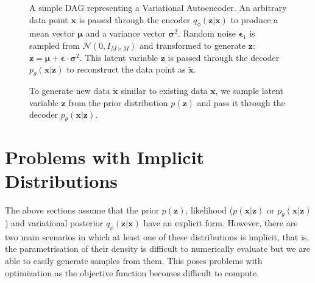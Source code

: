 \documentclass[honours,12pt]{unswthesis}
\numberwithin{equation}{section}
\theoremstyle{definition}
\begin{document}
\begin{figure}[h]
  \centering
   \caption{\small A simple DAG representing a Variational Autoencoder. An arbitrary data point $\bm{x}$ is passed through the encoder $q_\phi(\bm{z}|\bm{x})$ to produce a mean vector $\bm{\mu}$ and a variance vector $\bm{\sigma}^2$. Random noise $\bm{\epsilon}_1$ is sampled from $\mathcal{N}(0,I_{M\times M})$ and transformed to generate $\bm{z}$: $\bm{z}=\bm{\mu}+\bm{\epsilon}\cdot \bm{\sigma}^2$. This latent variable $\bm{z}$ is passed through the decoder $p_\theta(\bm{x}|\bm{z})$ to reconstruct the data point as $\tilde{\bm{x}}$.}
   \label{fig:3.3}
\end{figure}
\begin{figure}[h]
  \centering
   \caption{\small To generate new data $\tilde{\bm{x}}$ similar to existing data $\bm{x}$, we sample latent variable $\bm{z}$ from the prior distribution $p(\bm{z})$ and pass it through the decoder $p_\theta(\bm{x}|\bm{z})$.}
   \label{fig:3.4}
\end{figure}
\section{Problems with Implicit Distributions}\label{sec:3.8}
The above sections assume that the prior $p(\bm{z})$, likelihood ($p(\bm{x}|\bm{z})$ or $p_\theta(\bm{x}|\bm{z})$) and variational posterior $q_\phi(\bm{z}|\bm{x})$ have an explicit form. However, there are two main scenarios in which at least one of these distributions is implicit, that is, the parametrisation of their density is difficult to numerically evaluate but we are able to easily generate samples from them. This poses problems with optimization as the objective function becomes difficult to compute. 
\end{document}
